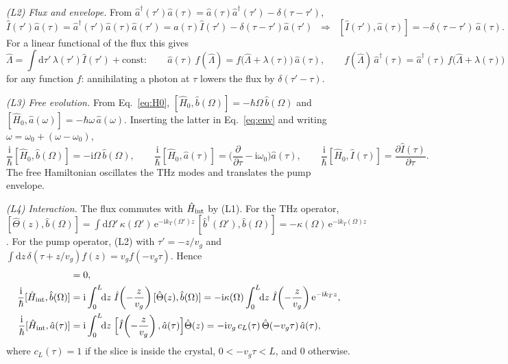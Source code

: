 \documentclass[aps,pra,onecolumn,notitlepage,11pt,amsmath,amssymb,nofootinbib]{revtex4-2}
\newcommand{\Iop}{\hat I}
\newcommand{\dd}{\mathrm{d}}
\newcommand{\ee}{\mathrm{e}}
\newcommand{\ii}{\mathrm{i}}
\begin{document}
\emph{(L2) Flux and envelope.} From
$\hat a^\dagger(\tau')\hat a(\tau)=\hat a(\tau)\hat a^\dagger(\tau')-\delta(\tau-\tau')$,
\begin{equation}
\Iop(\tau')\hat a(\tau)=\hat a^\dagger(\tau')\hat a(\tau)\hat a(\tau')
=\hat a(\tau)\Iop(\tau')-\delta(\tau-\tau')\hat a(\tau')
\;\;\Longrightarrow\;\;
[\Iop(\tau'),\hat a(\tau)]=-\delta(\tau-\tau')\,\hat a(\tau).
\label{eq:L2}
\end{equation}
For a linear functional of the flux this gives
\begin{equation}
\hat\Lambda=\int\!\dd\tau'\,\lambda(\tau')\Iop(\tau')+\text{const}:\qquad
\hat a(\tau)\,f(\hat\Lambda)=f\big(\hat\Lambda+\lambda(\tau)\big)\,\hat a(\tau),
\qquad
f(\hat\Lambda)\,\hat a^\dagger(\tau)=\hat a^\dagger(\tau)\,f\big(\hat\Lambda+\lambda(\tau)\big)
\label{eq:shift}
\end{equation}
for any function $f$: annihilating a photon at $\tau$ lowers the flux by
$\delta(\tau'-\tau)$.

\emph{(L3) Free evolution.} From Eq.~\eqref{eq:H0},
$[\hat H_0,\hat b(\Omega)]=-\hbar\Omega\,\hat b(\Omega)$ and
$[\hat H_0,\hat a(\omega)]=-\hbar\omega\,\hat a(\omega)$. Inserting the latter
in Eq.~\eqref{eq:env} and writing $\omega=\omega_0+(\omega-\omega_0)$,
\begin{equation}
\frac{\ii}{\hbar}[\hat H_0,\hat b(\Omega)]=-\ii\Omega\,\hat b(\Omega),\qquad
\frac{\ii}{\hbar}[\hat H_0,\hat a(\tau)]=\Big(\frac{\partial}{\partial\tau}-\ii\omega_0\Big)\hat a(\tau),\qquad
\frac{\ii}{\hbar}[\hat H_0,\Iop(\tau)]=\frac{\partial\Iop(\tau)}{\partial\tau}.
\label{eq:L3}
\end{equation}
The free Hamiltonian oscillates the THz modes and translates the pump
envelope.

\emph{(L4) Interaction.} The flux commutes with $\hat H_{\rm int}$ by (L1).
For the THz operator,
$[\hat\Theta(z),\hat b(\Omega)]=\int\dd\Omega'\,\kappa(\Omega')\,\ee^{-\ii k_T(\Omega')z}\,
[\hat b^\dagger(\Omega'),\hat b(\Omega)]=-\kappa(\Omega)\,\ee^{-\ii k_T(\Omega)z}$.
For the pump operator, (L2) with $\tau'=-z/v_g$ and
$\int\dd z\,\delta(\tau+z/v_g)f(z)=v_gf(-v_g\tau)$. Hence
\begin{align}
[\hat H_{\rm int},\Iop(\tau)]&=0,\label{eq:L4a}\\
\frac{\ii}{\hbar}[\hat H_{\rm int},\hat b(\Omega)]
&=\ii\int_0^L\!\!\dd z\;\Iop\!\left(-\frac{z}{v_g}\right)[\hat\Theta(z),\hat b(\Omega)]
=-\ii\kappa(\Omega)\int_0^L\!\!\dd z\;\Iop\!\left(-\frac{z}{v_g}\right)\ee^{-\ii k_Tz},
\label{eq:L4b}\\
\frac{\ii}{\hbar}[\hat H_{\rm int},\hat a(\tau)]
&=\ii\int_0^L\!\!\dd z\;\Big[\Iop\!\left(-\frac{z}{v_g}\right),\hat a(\tau)\Big]\hat\Theta(z)
=-\ii v_g\,c_L(\tau)\,\hat\Theta(-v_g\tau)\,\hat a(\tau),
\label{eq:L4c}
\end{align}
where $c_L(\tau)=1$ if the slice is inside the crystal, $0<-v_g\tau<L$, and
$0$ otherwise.
\end{document}

